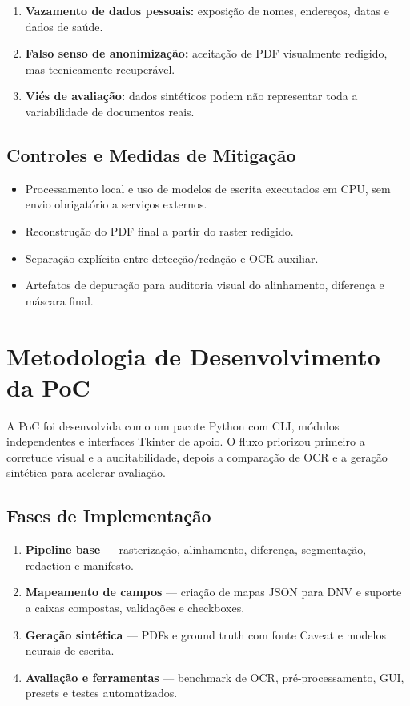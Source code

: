 \documentclass[12pt,a4paper]{article}
\begin{document}
\begin{enumerate}
    \item \textbf{Vazamento de dados pessoais:} exposição de nomes, endereços, datas e dados de saúde.
    \item \textbf{Falso senso de anonimização:} aceitação de PDF visualmente redigido, mas tecnicamente recuperável.
    \item \textbf{Viés de avaliação:} dados sintéticos podem não representar toda a variabilidade de documentos reais.
\end{enumerate}

\subsection{Controles e Medidas de Mitigação}

\begin{itemize}
    \item{} Processamento local e uso de modelos de escrita executados em CPU, sem envio obrigatório a serviços externos.
    \item{} Reconstrução do PDF final a partir do raster redigido.
    \item{} Separação explícita entre detecção/redação e OCR auxiliar.
    \item{} Artefatos de depuração para auditoria visual do alinhamento, diferença e máscara final.
\end{itemize}

\section{Metodologia de Desenvolvimento da PoC}
\label{sec:metodologia}

A PoC foi desenvolvida como um pacote Python com CLI, módulos independentes e interfaces Tkinter de apoio. O fluxo priorizou primeiro a corretude visual e a auditabilidade, depois a comparação de OCR e a geração sintética para acelerar avaliação.

\subsection{Fases de Implementação}

\begin{enumerate}
    \item \textbf{Pipeline base} — rasterização, alinhamento, diferença, segmentação, redaction e manifesto.
    \item \textbf{Mapeamento de campos} — criação de mapas JSON para DNV e suporte a caixas compostas, validações e checkboxes.
    \item \textbf{Geração sintética} — PDFs e ground truth com fonte Caveat e modelos neurais de escrita.
    \item \textbf{Avaliação e ferramentas} — benchmark de OCR, pré-processamento, GUI, presets e testes automatizados.
\end{enumerate}
\end{document}
